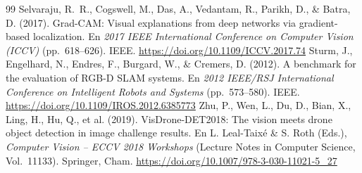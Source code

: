 \documentclass[conference]{IEEEtran}
\begin{document}
\begin{thebibliography}{99}
 Selvaraju, R.~R., Cogswell, M., Das, A., Vedantam, R., Parikh, D., \& Batra, D. (2017). Grad-CAM: Visual explanations from deep networks via gradient-based localization. En \emph{2017 IEEE International Conference on Computer Vision (ICCV)} (pp.~618--626). IEEE. \url{https://doi.org/10.1109/ICCV.2017.74}
 Sturm, J., Engelhard, N., Endres, F., Burgard, W., \& Cremers, D. (2012). A benchmark for the evaluation of RGB-D SLAM systems. En \emph{2012 IEEE/RSJ International Conference on Intelligent Robots and Systems} (pp.~573--580). IEEE. \url{https://doi.org/10.1109/IROS.2012.6385773}
 Zhu, P., Wen, L., Du, D., Bian, X., Ling, H., Hu, Q., et al. (2019). VisDrone-DET2018: The vision meets drone object detection in image challenge results. En L. Leal-Taixé \& S. Roth (Eds.), \emph{Computer Vision -- ECCV 2018 Workshops} (Lecture Notes in Computer Science, Vol.~11133). Springer, Cham. \url{https://doi.org/10.1007/978-3-030-11021-5_27}
\end{thebibliography}
\end{document}
